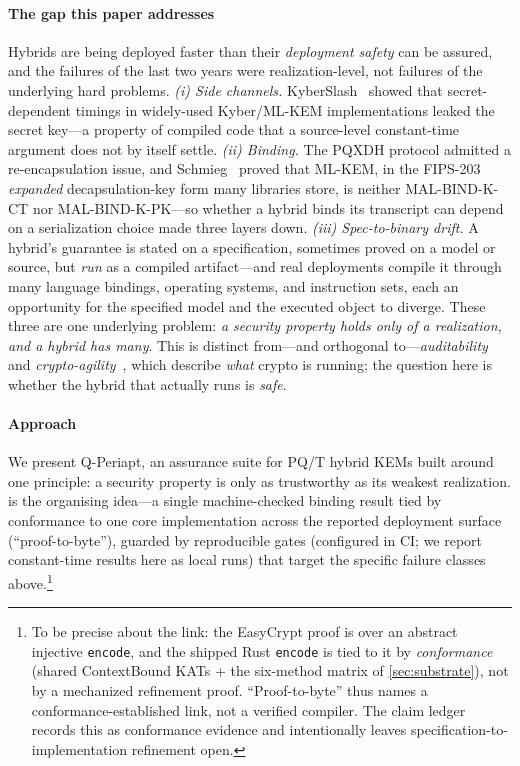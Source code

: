 \documentclass[journal]{IEEEtran}
\newcommand{\code}[1]{\texttt{\small #1}}
\begin{document}
\paragraph*{The gap this paper addresses}
Hybrids are being deployed faster than their \emph{deployment safety} can be assured, and the
failures of the last two years were realization-level, not failures of the underlying hard
problems. \emph{(i) Side channels.} KyberSlash~\cite{kyberslash} showed that secret-dependent
timings in widely-used Kyber/ML-KEM implementations leaked the secret key---a property of compiled
code that a source-level constant-time argument does not by itself settle. \emph{(ii) Binding.} The
PQXDH protocol admitted a re-encapsulation issue, and Schmieg~\cite{schmieg} proved that ML-KEM, in
the FIPS-203 \emph{expanded} decapsulation-key form many libraries store, is neither
\mbox{MAL-BIND-K-CT} nor \mbox{MAL-BIND-K-PK}---so whether a hybrid binds its transcript can depend
on a serialization choice made three layers down. \emph{(iii) Spec-to-binary drift.} A hybrid's
guarantee is stated on a specification, sometimes proved on a model or source, but \emph{run} as a
compiled artifact---and real deployments compile it through many language bindings, operating
systems, and instruction sets, each an opportunity for the specified model and the executed object to
diverge. These three are one underlying problem: \emph{a security property holds only of a
realization, and a hybrid has many}. This is distinct from---and orthogonal to---\emph{auditability}
and \emph{crypto-agility}~\cite{nistagility}, which describe \emph{what} crypto is running; the question here is whether
the hybrid that actually runs is \emph{safe}.

\paragraph*{Approach}
We present Q-Periapt, an assurance suite for PQ/T hybrid KEMs built around one principle: a
security property is only as trustworthy as its weakest realization.  is the
organising idea---a single machine-checked binding result tied by conformance to one core
implementation across the reported deployment surface (``proof-to-byte''), guarded by
reproducible gates (configured in CI; we report constant-time results here as local runs) that
target the specific failure classes above.\footnote{To be precise about the link: the EasyCrypt
proof is over an abstract injective \code{encode}, and the shipped Rust \code{encode} is tied to it
by \emph{conformance} (shared ContextBound KATs + the six-method matrix of \cref{sec:substrate}),
not by a mechanized refinement proof. ``Proof-to-byte'' thus names a conformance-established link,
not a verified compiler. The claim ledger records this as conformance evidence and intentionally
leaves specification-to-implementation refinement open.}
\end{document}
